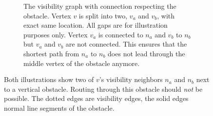 \begin{figure}[h]
\begin{figcenter}
\begin{subfigure}[t]{.48\textwidth}
\begin{figcenter}
						\end{figcenter}
						\caption{
							The visibility graph with connection respecting the obstacle. Vertex $v$ is split into two, $v_a$ and $v_b$, with exact same location. All gaps are for illustration purposes only.
							Vertex $v_a$ is connected to $n_a$ and $v_b$ to $n_b$ but $v_a$ and $v_b$ are not connected.
							This ensures that the shortest path from $n_a$ to $n_b$ does not lead through the middle vertex of the obstacle anymore.
						}
						\label{fig:routing-through-line-obstacle-b}
					\end{subfigure}
				\end{figcenter}
				\caption{
					Both illustrations show two of $v$'s visibility neighbors $n_a$ and $n_b$ next to a vertical obstacle. Routing through this obstacle should \emph{not} be possible.
					The dotted edges are visibility edges, the solid edges normal line segments of the obstacle.
				}
				\label{fig:routing-through-line-obstacle}
			\end{figure}
			
